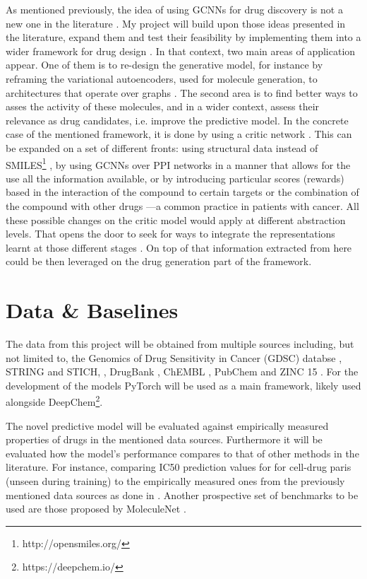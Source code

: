 \documentclass{article}
\begin{document}
As mentioned previously, the idea of using GCNNs for drug discovery is not a new one in
the literature \cite{Sun2019}. My project will build upon those ideas presented in the
literature, expand them and test their feasibility by implementing them into a wider
framework for drug design \cite{Born2019}. In that context, two main areas of
application appear. One of them is to re-design the generative model, for instance by
reframing the variational autoencoders, used for molecule generation, to architectures
that operate over graphs \cite{Simonovsky2018,Li2018, Li2018a}. The second area is to
find better ways to asses the activity of these molecules, and in a wider context,
assess their relevance as drug candidates, i.e. improve the predictive model. In the
concrete case of the mentioned framework, it is done by using a critic network
\cite{Manica2019}. This can be expanded on a set of different fronts: using structural
data instead of SMILES\footnote{http://opensmiles.org/} \cite{Li, Do2019}, by using
GCNNs over PPI networks in a manner that allows for the use all the information
available\cite{Oskooei2019, Wang2019}, or by introducing particular scores (rewards)
based in the interaction of the compound to certain targets \cite{YingkaiGao2018,
Zhavoronkov2019} or the combination of the compound with other drugs
\cite{Zitnik2018}---a common practice in patients with cancer. All these possible
changes on the critic model would apply at different abstraction levels. That opens the
door to seek for ways to integrate the representations learnt at those different stages
\cite{Ying2018, Ma2019, Huang2019}. On top of that information extracted from here could
be then leveraged on the drug generation part of the framework.


    \section*{Data \& Baselines}

The data from this project will be obtained from multiple sources including, but not
limited to, the Genomics of Drug Sensitivity in Cancer (GDSC) databse \cite{Yang2013},
STRING and STICH, \cite{Szklarczyk2019,Szklarczyk2016}, DrugBank \cite{Wishart2006},
ChEMBL \cite{Gaulton2017}, PubChem \cite{Kim2019} and ZINC 15 \cite{Sterling2015}. For
the development of the models PyTorch \cite{Paszke2019} will be used as a main
framework, likely used alongside DeepChem\footnote{https://deepchem.io/}.

The novel predictive model will be evaluated against empirically measured properties of
drugs in the mentioned data sources. Furthermore it will be evaluated how the model's
performance compares to that of other methods in the literature. For instance, comparing
IC50 prediction values for for cell-drug paris (unseen during training) to the
empirically measured ones from the previously mentioned data sources as done in
\cite{Oskooei2019, Joo2019, Oskooei2018}. Another prospective set of benchmarks to be
used are those proposed by MoleculeNet \cite{Wu2018}.
\end{document}
